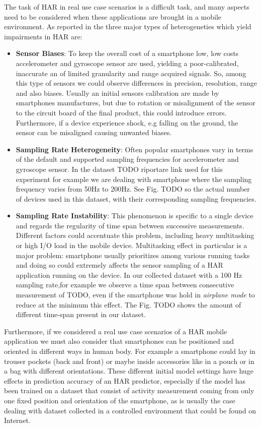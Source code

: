 The task of HAR in real use case scenarios is a difficult task, and many aspects need to be considered when these applications are brought in a mobile environment. As reported in \cite{blunck2013heterogeneity} the three major types of heterogeneties which yield impairments in HAR are:
\begin{itemize}
	\item \textbf{Sensor Biases}: To keep the overall cost of a smartphone low, low costs accelerometer and gyroscope sensor are used, yielding a poor-calibrated, inaccurate an of limited granularity and range acquired signals. So, among this type of sensors we could observe differences in precision, resolution, range and also biases. Usually an initial sensors calibration are made by smartphones manufactures, but due to rotation or misalignment of the sensor to the circuit board of the final product, this could introduce errors. Furthermore, if a device experience shock, e.g falling on the ground, the sensor can be misaligned causing unwanted biases.
	\item \textbf{Sampling Rate Heterogeneity}: Often popular smartphones vary in terms of the default and supported sampling frequencies for accelerometer and gyroscope sensor. In the dataset TODO riportare link used for this experiment for example we are dealing with smartphone where the sampling frequency varies from 50Hz to 200Hz. See Fig. TODO so the actual number of devices used in this dataset, with their corresponding sampling frequencies.
	\item \textbf{Sampling Rate Instability}: This phenomenon is specific to a single device and regards the regularity of time span between successive measurements. Different factors could accentuate this problem, including heavy multitasking or high I/O load in the mobile device. Multitasking effect in particular is a major problem: smartphone usually prioritizes among various running tasks and doing so could extremely affects the sensor sampling of a HAR application running on the device. In our collected dataset with a 100 Hz sampling rate,for example we observe a time span between consecutive measurement of TODO, even if the smartphone was hold in \textit{airplane mode} to reduce at the minimum this effect. The Fig. TODO shows the amount of different time-span present in our dataset.
\end{itemize}

Furthermore, if we considered a real use case scenarios of a HAR mobile application we must also consider that smartphones can be positioned and oriented in different ways in human body. For example a smartphone could lay in trouser pockets (back and front) or maybe inside accessories like in a pouch or in a bag with different orientations. These different initial model settings have huge effects in prediction accuracy of an HAR predictor, especially if the model has been trained on a dataset that consist of activity measurement coming from only one fixed position and orientation of the smartphone, as is usually the case dealing with dataset collected in a controlled environment that could be found on Internet.

